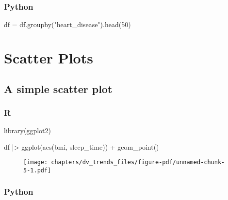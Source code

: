 \documentclass[
  letterpaper,
  DIV=11,
  numbers=noendperiod]{scrreprt}
\newenvironment{Shaded}{\begin{snugshade}}{\end{snugshade}}
\newcommand{\DecValTok}[1]{\textcolor[rgb]{0.68,0.00,0.00}{#1}}
\newcommand{\FunctionTok}[1]{\textcolor[rgb]{0.28,0.35,0.67}{#1}}
\newcommand{\NormalTok}[1]{\textcolor[rgb]{0.00,0.46,0.62}{#1}}
\newcommand{\OperatorTok}[1]{\textcolor[rgb]{0.37,0.37,0.37}{#1}}
\newcommand{\SpecialCharTok}[1]{\textcolor[rgb]{0.37,0.37,0.37}{#1}}
\newcommand{\StringTok}[1]{\textcolor[rgb]{0.13,0.47,0.30}{#1}}
\begin{document}
\hypertarget{python-38}{%
\subsubsection{Python}\label{python-38}}

\begin{Shaded}
\begin{Highlighting}[]
\NormalTok{df }\OperatorTok{=}\NormalTok{ df.groupby(}\StringTok{"heart\_disease"}\NormalTok{).head(}\DecValTok{50}\NormalTok{)}
\end{Highlighting}
\end{Shaded}

\hypertarget{scatter-plots}{%
\section{Scatter Plots}\label{scatter-plots}}

\hypertarget{a-simple-scatter-plot}{%
\subsection{A simple scatter plot}\label{a-simple-scatter-plot}}

\hypertarget{r-39}{%
\subsubsection{R}\label{r-39}}

\begin{Shaded}
\begin{Highlighting}[]
\FunctionTok{library}\NormalTok{(ggplot2)}

\NormalTok{df }\SpecialCharTok{|\textgreater{}} 
    \FunctionTok{ggplot}\NormalTok{(}\FunctionTok{aes}\NormalTok{(bmi, sleep\_time)) }\SpecialCharTok{+}
    \FunctionTok{geom\_point}\NormalTok{()}
\end{Highlighting}
\end{Shaded}

\begin{figure}[H]

{\centering \texttt{[image: chapters/dv\_trends\_files/figure-pdf/unnamed-chunk-5-1.pdf]}

}

\end{figure}

\hypertarget{python-39}{%
\subsubsection{Python}\label{python-39}}
\end{document}
